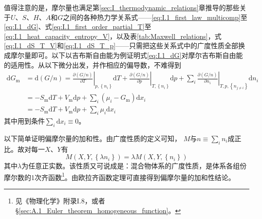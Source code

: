 \documentclass[main.tex]{subfiles}
\begin{document}
值得注意的是，摩尔量也满足第\ref{sec:I_thermodynamic_relations}章推导的那些关于$U$、$S$、$H$、$A$和$G$之间的各种热力学关系式——\eqref{eq:I.1_first_law_multicomp}至\eqref{eq:I.1_dG}、式\eqref{eq:I.1_first_order_partial_T}至\eqref{eq:I.1_heat_capacity_entropy_V}，以及表\ref{tab:Maxwell_relations}，式\eqref{eq:I.1_dS_T_V}和\eqref{eq:I.1_dS_T_p}——只需把这些关系式中的广度性质全部换成摩尔量即可。以下以吉布斯自由能为例证明式\eqref{eq:I.1_dG}对摩尔吉布斯自由能的适用性。从以下微分出发，并作相应的偏导数，不难得到
\begin{align*}
    \mathrm{d}G_\text{m} & =\mathrm{d}\left(G/n\right)=\left.\frac{\partial\left(G/n\right)}{\partial T}\right|_{p,\left\{n_i\right\}}\mathrm{d}T+\left.\frac{\partial\left(G/n\right)}{\partial p}\right|_{T,\left\{n_i\right\}}\mathrm{d}p+\sum_i\left.\frac{\partial\left(G/n\right)}{\partial n_i}\right|_{T,p,\left\{n_{j\neq i}\right\}}\mathrm{d}n_i \\
                         & =-S_\text{m}\mathrm{d}T+V_\text{m}\mathrm{d}p+\sum_i\left(\mu_i-G_\text{m}\right)\mathrm{d}x_i                                                                                                                                                                                                                                   \\
                         & =-S_\text{m}\mathrm{d}T+V_\text{m}\mathrm{d}p+\sum_i\mu_i\mathrm{d}x_i
\end{align*}
其中用到条件$\sum_i\mathrm{d}x_i\equiv 0$。

以下简单证明偏摩尔量的加和性。由广度性质的定义可知， $M$与$n\equiv\sum_in_i$成正比。故对每一$X$、$Y$有
\[M\left(X,Y,\left\{\lambda n_i\right\}\right)=\lambda M\left(X,Y,\left\{n_i\right\}\right)\]
其中$\lambda$为任意正实数。该性质又可说成是：混合物体系的广度性质，是体系各组份摩尔数的1次齐函数\footnote{见《物理化学》附录I.8，或者\S\ref{sec:A.1_Euler_theorem_homogeneous_function}。}。由欧拉齐函数定理可直接得到偏摩尔量的加和性结论。
\end{document}
